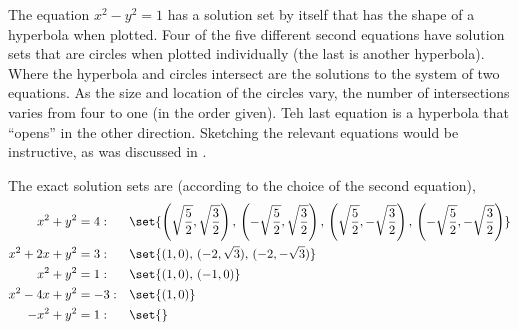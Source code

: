 The equation $x^2-y^2=1$ has a solution set by itself that has the shape of a hyperbola when plotted.  Four of the  five different second equations have solution sets that are circles when plotted individually (the last is another hyperbola).  Where the hyperbola and circles intersect are the solutions to the system of two equations.  As the size and location of the circles vary, the number of intersections varies from four to one (in the order given).  Teh last equation is a hyperbola that ``opens'' in the other direction.  Sketching the relevant equations would be instructive, as was discussed in .\par
%
The exact solution sets are (according to the choice of the second equation),
%
\begin{align*}
x^2+y^2&=4:
&&
\set{\left(\sqrt{\frac{5}{2}},\sqrt{\frac{3}{2}}\right),\,\left(-\sqrt{\frac{5}{2}},\sqrt{\frac{3}{2}}\right),\,\left(\sqrt{\frac{5}{2}},-\sqrt{\frac{3}{2}}\right),\,\left(-\sqrt{\frac{5}{2}},-\sqrt{\frac{3}{2}}\right)}\\
%
x^2+2x+y^2&=3:
&&
\set{(1,0),\,(-2,\sqrt{3}),\,(-2,-\sqrt{3})}\\
%
x^2+y^2&=1:
&&
\set{(1,0),\,(-1,0)}\\
%
x^2-4x+y^2&=-3:
&&
\set{(1,0)}\\
%
-x^2+y^2&=1:
&&
\set{}
\end{align*}
